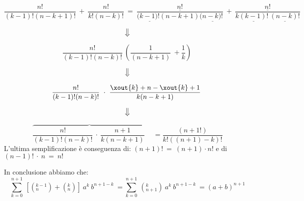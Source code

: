 \begin{dimo}
	\begin{equation}
	\frac{n!}{(k-1)!(n-k+1)!}\ +\ \frac{n!}{k!(n-k)!}\ =\
	\frac{\underline{n!}}{(\underline{k-1)!}(n-k+1)(\underline{n-k)!}}\ +\ 
	\frac{\underline{n!}}{k\underline{(k-1)!}\ \underline{(n-k)!}}
	\end{equation}
			
	\begin{equation}
	\big\Downarrow
	\end{equation}
	
	\begin{equation} 
	\frac{n!}{(k-1)!(n-k)!}\ \left( \frac{1}{(n-k+1)}\ + \frac{1}{k} \right)\
	\end{equation}

	\begin{equation}
	\big\Downarrow
	\end{equation}
	

	\begin{equation}
	\frac{n!}{(k-1)!(n-k)!}\ \cdot\ 
	\frac{\xout{k} + n - \xout{k} + 1}{k (n-k+1)}\
	\end{equation}

	\begin{equation}
	\big\Downarrow
	\end{equation}
	
	
	\begin{equation}
	\overbrace{
	\frac{n!}{(k-1)!(n-k)!}\ \cdot\
	\frac{n+1}{k(n-k+1)}\ } \quad =
	\frac{(n+1!)}{k!((n+1)-k)!}
	\end{equation}
L'ultima semplificazione è conseguenza di: $(n+1)!\ =\ (n+1) \cdot n!$
e di $(n-1)!\ \cdot \ n\ =\ n!$

In conclusione abbiamo che:
	\begin{equation}
	\sum_{k=0}^{n+1}\ [(_{n}^{k-1}) + (_{n}^{k})]\ a^{k}\ b^{n+1-k}\ =
	\sum_{k=0}^{n+1}\ (_{n+1}^{k})\ a^{k}\ b^{n+1-k}\ =
	(a + b)^{n+1}
	\end{equation}

\end{dimo}

